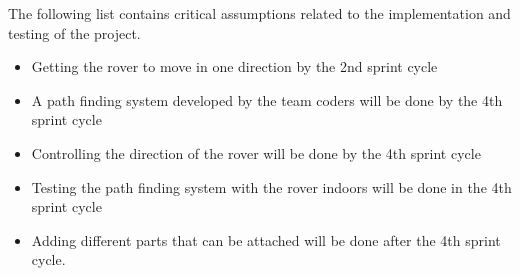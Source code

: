 


The following list contains critical assumptions related to the implementation and testing of the project.


\begin{itemize}
  \item Getting the rover to move in one direction by the 2nd sprint cycle
  \item A path finding system developed by the team coders will be done by the 4th sprint cycle
  \item Controlling the direction of the rover will be done by the 4th sprint cycle
  \item Testing the path finding system with the rover indoors will be done in the 4th sprint cycle
  \item Adding different parts that can be attached will be done after the 4th sprint cycle.
\end{itemize}